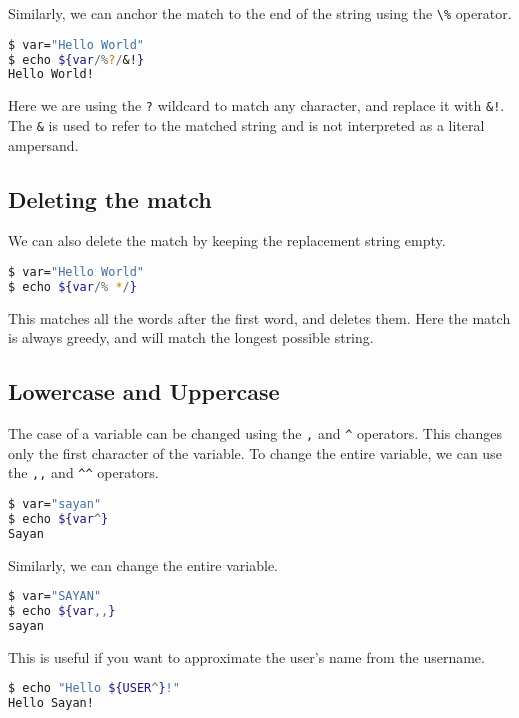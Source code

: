Similarly, we can anchor the match to the end of the string using the \lstinline{\%} operator.

\begin{lstlisting}[language=bash]
$ var="Hello World"
$ echo ${var/%?/&!}
Hello World!
\end{lstlisting}

Here we are using the \lstinline{?} wildcard to match any character, and replace it with \lstinline{&!}.
The \lstinline{&} is used to refer to the matched string and is not interpreted as a literal ampersand.

\subsection{Deleting the match}

We can also delete the match by keeping the replacement string empty.

\begin{lstlisting}[language=bash]
$ var="Hello World"
$ echo ${var/% */}
\end{lstlisting}

This matches all the words after the first word, and deletes them.
Here the match is always greedy, and will match the longest possible string.

\subsection{Lowercase and Uppercase}

The case of a variable can be changed using the \lstinline{,} and \lstinline{^} operators.
This changes only the first character of the variable.
To change the entire variable, we can use the \lstinline{,,} and \lstinline{^^} operators.

\begin{lstlisting}[language=bash]
$ var="sayan"
$ echo ${var^}
Sayan
\end{lstlisting}

Similarly, we can change the entire variable.

\begin{lstlisting}[language=bash]
$ var="SAYAN"
$ echo ${var,,}
sayan
\end{lstlisting}

This is useful if you want to approximate the user's name from the username.

\begin{lstlisting}[language=bash]
$ echo "Hello ${USER^}!"
Hello Sayan!
\end{lstlisting}


